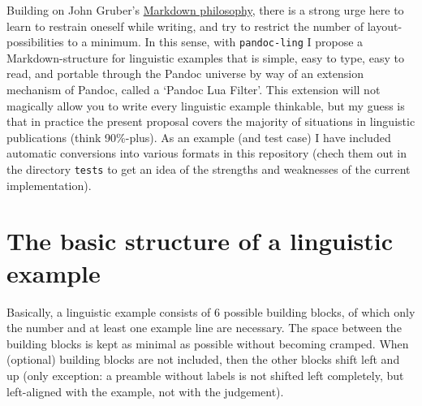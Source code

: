 \documentclass[
]{article}
\begin{document}
Building on John Gruber's
\href{https://daringfireball.net/projects/markdown/syntax}{Markdown
philosophy}, there is a strong urge here to learn to restrain oneself
while writing, and try to restrict the number of layout-possibilities to
a minimum. In this sense, with \texttt{pandoc-ling} I propose a
Markdown-structure for linguistic examples that is simple, easy to type,
easy to read, and portable through the Pandoc universe by way of an
extension mechanism of Pandoc, called a `Pandoc Lua Filter'. This
extension will not magically allow you to write every linguistic example
thinkable, but my guess is that in practice the present proposal covers
the majority of situations in linguistic publications (think 90\%-plus).
As an example (and test case) I have included automatic conversions into
various formats in this repository (chech them out in the directory
\texttt{tests} to get an idea of the strengths and weaknesses of the
current implementation).

\section{The basic structure of a linguistic
example}\label{the-basic-structure-of-a-linguistic-example}

Basically, a linguistic example consists of 6 possible building blocks,
of which only the number and at least one example line are necessary.
The space between the building blocks is kept as minimal as possible
without becoming cramped. When (optional) building blocks are not
included, then the other blocks shift left and up (only exception: a
preamble without labels is not shifted left completely, but left-aligned
with the example, not with the judgement).
\end{document}
